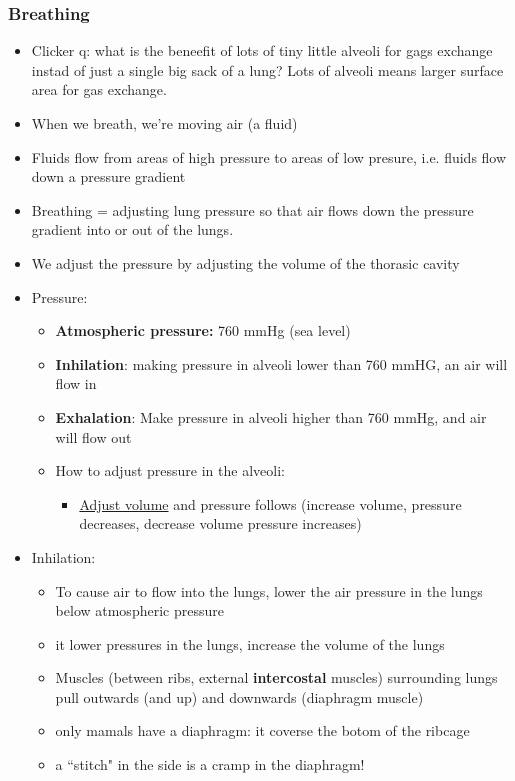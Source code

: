 \documentclass{article}
\theoremstyle{definition}
\begin{document}
\subsubsection{Breathing}
\begin{itemize}
	\item Clicker q: what is the beneefit of lots of tiny little alveoli for gags exchange instad of just a single big sack of a lung? Lots of alveoli means larger surface area for gas exchange.
	\item When we breath, we're moving air (a fluid)
	\item Fluids flow from areas of high pressure to areas of low presure, i.e. fluids flow down a pressure gradient
	\item Breathing = adjusting lung pressure so that air flows down the pressure gradient into or out of the lungs.
	\item We adjust the pressure by adjusting the volume of the thorasic cavity
	\item Pressure:
		\begin{itemize}
			\item \textbf{Atmospheric pressure:} 760 mmHg (sea level)
			\item \textbf{Inhilation}: making pressure in alveoli lower than 760 mmHG, an air will flow in
			\item \textbf{Exhalation}: Make pressure in alveoli higher than 760 mmHg, and air will flow out
			\item How to adjust pressure in the alveoli:
				\begin{itemize}
					\item \underline{Adjust volume} and pressure follows (increase volume, pressure decreases, decrease volume pressure  increases)
				\end{itemize}
		\end{itemize}
	\item Inhilation:
		\begin{itemize}
			\item To cause air to flow into the lungs, lower the air pressure in the lungs below atmospheric pressure
			\item it lower pressures in the lungs, increase the volume of the lungs
		\item Muscles (between ribs, external \textbf{intercostal} muscles) surrounding lungs pull outwards (and up) and downwards (diaphragm muscle)
			\item only mamals have a diaphragm: it coverse the botom of the ribcage
			\item a ``stitch" in the side is a cramp in the diaphragm!

\end{itemize}
\end{itemize}
\end{document}
